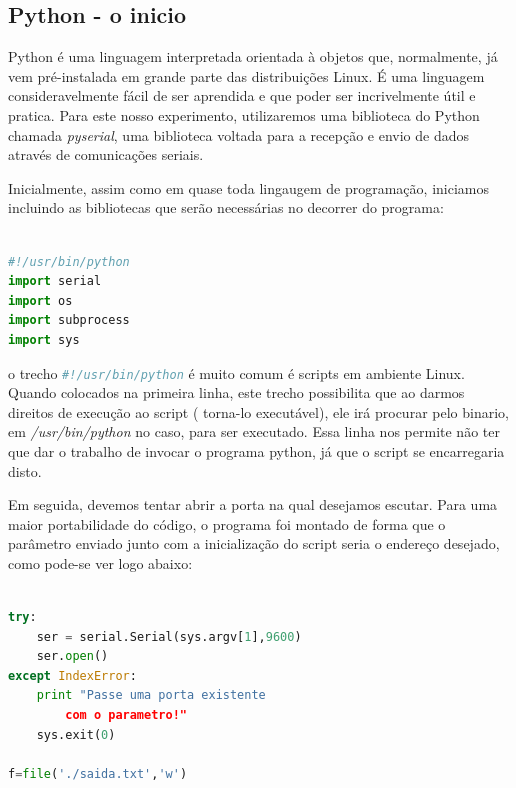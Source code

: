 \begin{multicols}{2}
\subsection{Python - o inicio}\label{python1}

Python é uma linguagem interpretada orientada à objetos que, normalmente, já vem pré-instalada em grande parte das distribuições Linux. É uma linguagem consideravelmente fácil de ser aprendida e que poder ser incrivelmente útil e pratica. Para este nosso experimento, utilizaremos uma biblioteca do Python chamada \textit{\cite{pyserial}pyserial}, uma biblioteca voltada para a recepção e envio de dados através de comunicações seriais.

Inicialmente, assim como em quase toda lingaugem de programação, iniciamos incluindo as bibliotecas que serão necessárias no decorrer do programa:


\begin{lstlisting}[basicstyle=\ttfamily,language=Python,numbers=none,caption={[Bibliotecas do Python] Inclusão das bibliotecas do Python}]

#!/usr/bin/python
import serial
import os
import subprocess
import sys

\end{lstlisting}

o trecho \lstinline [basicstyle=\ttfamily,language=Python]{#!/usr/bin/python} é muito comum é scripts em ambiente Linux. Quando colocados na primeira linha, este trecho possibilita que ao darmos direitos de execução ao script ( torna-lo executável), ele irá procurar pelo binario, em \textit{/usr/bin/python} no caso, para ser executado. Essa linha nos permite não ter que dar o trabalho de invocar o programa python, já que o script se encarregaria disto.

Em seguida, devemos tentar abrir a porta na qual desejamos escutar. Para uma maior portabilidade do código, o programa foi montado de forma que o parâmetro enviado junto com a inicialização do script seria o endereço desejado, como pode-se ver logo abaixo:

\begin{lstlisting}[basicstyle=\ttfamily,language=Python,numbers=none,caption={[Acessando a porta serial]Acessando a porta serial}]

try:
	ser = serial.Serial(sys.argv[1],9600)
	ser.open()
except IndexError:
	print "Passe uma porta existente 
		com o parametro!"
	sys.exit(0)

f=file('./saida.txt','w')


\end{lstlisting}
\end{multicols}
